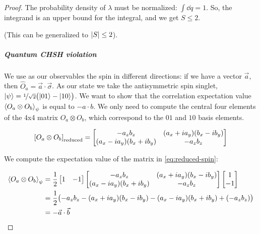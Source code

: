 \documentclass[main.tex]{subfiles}
\begin{document}
\begin{proof}
The probability density of \(\lambda\) must be normalized: \(\int  \dd{q} = 1  \). So, the integrand is an upper bound for the integral, and we get \(S \leq 2\).

(This can be generalized to \(\abs{S} \leq 2 \)).

\subparagraph{Quantum CHSH violation}

We use as our observables the spin in different directions: if we have a vector \(\vec{a}\), then \(\hat{O}_a = \vec{a} \cdot \vec\sigma\). As our state we take the antisymmetric spin singlet, \(\ket{\psi } = \frac[i]{1}{\sqrt{2} }  \qty( \ket{01}- \ket{10} )\). We want to show that the correlation expectation value \(\expval{O_a \otimes O_b}_\psi \) is equal to \(-a \cdot b\). We only need to compute the central four elements of the 4x4 matrix \(O_a \otimes O_b\), which correspond to the \(01\) and \(10\) basis elements.

\begin{equation} \label{eq:reduced-spin}
    \qty[O_a \otimes O_b] _{\text{reduced}} = \begin{bmatrix}
    -a_z b_z   & (a_x + i a_y)(b_x - i b_y) \\
      (a_x- i a_y)(b_x + i b_y) & - a_z b_z
    \end{bmatrix}
\end{equation}

We compute the expectation value of the matrix in \eqref{eq:reduced-spin}:

\begin{subequations}
\begin{align}
    \expval{O_a \otimes O_b}_\psi &= \frac{1}{2} \begin{bmatrix}
    1 & -1
    \end{bmatrix}
    \begin{bmatrix}
    -a_z b_z   & (a_x + i a_y)(b_x - i b_y) \\
      (a_x- i a_y)(b_x + i b_y) & - a_z b_z
    \end{bmatrix}
    \begin{bmatrix}
    1 \\
    -1
\end{bmatrix}  \\
&= \frac{1}{2}\qty( -a_z b_z   - (a_x + i a_y)(b_x - i b_y)
  -(a_x- i a_y)(b_x + i b_y) + (- a_z b_z))  \\
&= - \vec{a} \cdot \vec{b} \label{eq:CHSH-pauli-scalar-product}
\end{align}
\end{subequations}


\end{proof}
\end{document}
